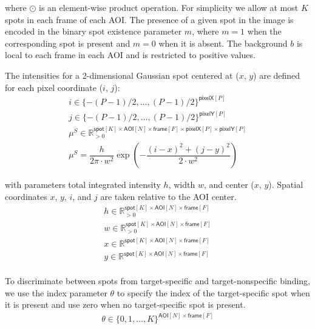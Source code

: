\noindent
where $\odot$ is an element-wise product operation. For simplicity we allow at most $K$ spots in each frame of each AOI. The presence of a given spot in the image is encoded in the binary spot existence parameter $m$, where $m = 1$ when the corresponding spot is present and $m = 0$ when it is absent. The background $b$ is local to each frame in each AOI and is restricted to positive values.



The intensities for a 2-dimensional Gaussian spot centered at ($x$, $y$) are defined for each pixel coordinate ($i$, $j$):
%
\begin{gather*}
    i \in \{-(P-1)/2, \dots, (P-1)/2\}^{\mathsf{pixelX}[P]} \\
    j \in \{-(P-1)/2, \dots, (P-1)/2\}^{\mathsf{pixelY}[P]} \\
    \mu^S \in \mathbb{R}_{>0}^{\mathsf{spot}[K] \times \mathsf{AOI}[N] \times \mathsf{frame}[F] \times \mathsf{pixelX}[P] \times \mathsf{pixelY}[P]}  \\
    \mu^S = \dfrac{h}{2 \pi \cdot w^2} \exp{\left( -\dfrac{(i-x)^2 + (j-y)^2}{2 \cdot w^2} \right)}
\end{gather*}

\noindent
with parameters total integrated intensity $h$, width $w$, and center ($x$, $y$). Spatial coordinates $x$, $y$, $i$, and $j$ are taken relative to the AOI center. 
%
\begin{gather*}
    h \in \mathbb{R}_{>0}^{\mathsf{spot}[K] \times \mathsf{AOI}[N] \times \mathsf{frame}[F]} \\
    w \in \mathbb{R}_{>0}^{\mathsf{spot}[K] \times \mathsf{AOI}[N] \times \mathsf{frame}[F]} \\
    x \in \mathbb{R}^{\mathsf{spot}[K] \times \mathsf{AOI}[N] \times \mathsf{frame}[F]} \\
    y \in \mathbb{R}^{\mathsf{spot}[K] \times \mathsf{AOI}[N] \times \mathsf{frame}[F]} \\
\end{gather*}



To discriminate between spots from target-specific and target-nonspecific binding, we use the index parameter $\theta$ to specify the index of the target-specific spot when it is present and use zero when no target-specific spot is present.
%
\begin{gather*}
    \theta \in \{ 0, 1, \dots, K \}^{ \mathsf{AOI}[N] \times \mathsf{frame}[F] } \\
\end{gather*}

